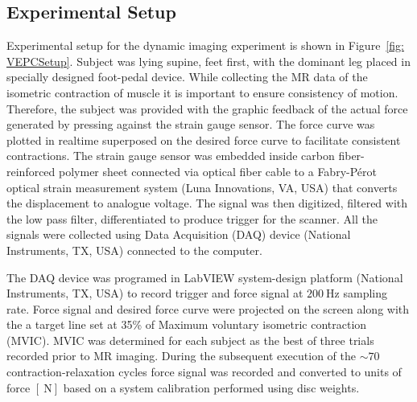 \subsection{Experimental Setup}
Experimental setup for the dynamic imaging experiment is shown in Figure~\ref{fig: VEPCSetup}.
Subject was lying supine, feet first, with the dominant leg placed in specially designed foot-pedal device.
While collecting the MR data of the isometric contraction of muscle it is important to ensure consistency of motion.
Therefore, the subject was provided with the graphic feedback of the actual force generated by pressing against the strain gauge sensor. 
The force curve was plotted in realtime superposed on the desired force curve to facilitate consistent contractions. 
The strain gauge sensor was embedded inside carbon fiber-reinforced polymer sheet connected via optical fiber cable to a Fabry-P\'erot optical strain measurement system (Luna Innovations, VA, USA) that converts the displacement to analogue voltage. 
The signal was then digitized, filtered with the low pass filter, differentiated to produce trigger for the scanner. All the signals were collected using Data Acquisition (DAQ) device (National Instruments, TX, USA) connected to the computer.

The DAQ device was programed in LabVIEW system-design platform (National Instruments, TX, USA) to record trigger and force signal at $\SI{200}{\hertz}$ sampling rate. 
Force signal and desired force curve were projected on the screen along with the a target line set at 35\% of Maximum voluntary isometric contraction (MVIC). 
MVIC was determined for each subject as the best of three trials recorded prior to MR imaging. 
During the subsequent execution of the $\sim70$ contraction-relaxation cycles force signal was recorded and converted to units of force $\left[ \SI{}{\newton}\right]$ based on a system calibration  performed using disc weights.


